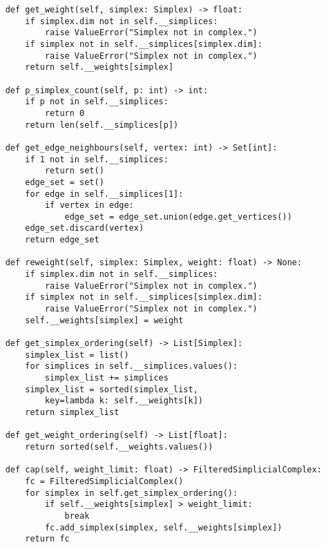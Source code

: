 \begin{verbatim}
    def get_weight(self, simplex: Simplex) -> float:
        if simplex.dim not in self.__simplices:
            raise ValueError("Simplex not in complex.")
        if simplex not in self.__simplices[simplex.dim]:
            raise ValueError("Simplex not in complex.")
        return self.__weights[simplex]

    def p_simplex_count(self, p: int) -> int:
        if p not in self.__simplices:
            return 0
        return len(self.__simplices[p])

    def get_edge_neighbours(self, vertex: int) -> Set[int]:
        if 1 not in self.__simplices:
            return set()
        edge_set = set()
        for edge in self.__simplices[1]:
            if vertex in edge:
                edge_set = edge_set.union(edge.get_vertices())
        edge_set.discard(vertex)
        return edge_set

    def reweight(self, simplex: Simplex, weight: float) -> None:
        if simplex.dim not in self.__simplices:
            raise ValueError("Simplex not in complex.")
        if simplex not in self.__simplices[simplex.dim]:
            raise ValueError("Simplex not in complex.")
        self.__weights[simplex] = weight

    def get_simplex_ordering(self) -> List[Simplex]:
        simplex_list = list()
        for simplices in self.__simplices.values():
            simplex_list += simplices
        simplex_list = sorted(simplex_list, 
            key=lambda k: self.__weights[k])
        return simplex_list

    def get_weight_ordering(self) -> List[float]:
        return sorted(self.__weights.values())

    def cap(self, weight_limit: float) -> FilteredSimplicialComplex:
        fc = FilteredSimplicialComplex()
        for simplex in self.get_simplex_ordering():
            if self.__weights[simplex] > weight_limit:
                break
            fc.add_simplex(simplex, self.__weights[simplex])
        return fc
\end{verbatim}
